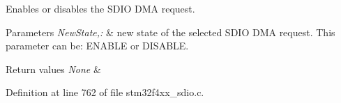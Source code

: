 Enables or disables the S\-D\-I\-O D\-M\-A request. 


\begin{DoxyParams}{Parameters}
{\em New\-State,\-:} & new state of the selected S\-D\-I\-O D\-M\-A request. This parameter can be\-: E\-N\-A\-B\-L\-E or D\-I\-S\-A\-B\-L\-E. \\
\hline
\end{DoxyParams}

\begin{DoxyRetVals}{Return values}
{\em None} & \\
\hline
\end{DoxyRetVals}


Definition at line 762 of file stm32f4xx\-\_\-sdio.\-c.

